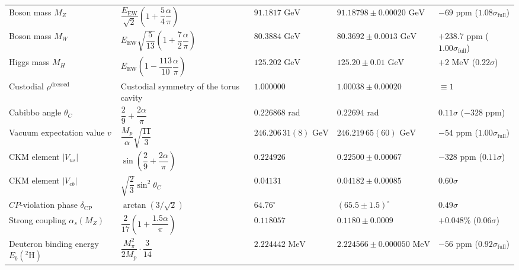 \documentclass[11pt,a4paper]{article}
\theoremstyle{definition}
\theoremstyle{remark}
\begin{document}
\begin{xltabular}{\textwidth}{
>{\raggedright\arraybackslash}p{3.8cm}
>{\centering\arraybackslash}X
>{\centering\arraybackslash}p{2.7cm}
>{\centering\arraybackslash}p{2.8cm}
>{\centering\arraybackslash}p{2.0cm}
}
Boson mass $M_Z$ & $\dfrac{E_{\mathrm{EW}}}{\sqrt{2}}\left(1 + \dfrac{5}{4}\dfrac{\alpha}{\pi}\right)$ & $91.1817\text{ GeV}$ & $91.18798 \pm 0.00020\text{ GeV}$ & $-69\text{ ppm}$ ($1.08\sigma_{\mathrm{full}}$) \\

Boson mass $M_W$ & $E_{\mathrm{EW}}\sqrt{\dfrac{5}{13}}\left(1 + \dfrac{7}{2}\dfrac{\alpha}{\pi}\right)$ & $80.3884\text{ GeV}$ & $80.3692 \pm 0.0013\text{ GeV}$ & $+238.7\text{ ppm}$ ($1.00\sigma_{\mathrm{full}}$) \\


Higgs mass $M_H$ & $E_{\mathrm{EW}}\left(1 - \dfrac{113}{10}\dfrac{\alpha}{\pi}\right)$ & $125.202\text{ GeV}$ & $125.20 \pm 0.01\text{ GeV}$ & $+2\text{ MeV}$ ($0.22\sigma$) \\

Custodial $\rho^{\mathrm{dressed}}$ & Custodial symmetry of the torus cavity & $1.000000$ & $1.00038 \pm 0.00020$ &  $\equiv 1$ \\

Cabibbo angle $\theta_C$ & $\dfrac{2}{9} + \dfrac{2\alpha}{\pi}$ & $0.226868\text{ rad}$ & $0.22694\text{ rad}$ & $0.11\sigma$ ($-328\text{ ppm}$) \\

Vacuum expectation value $v$ & $\dfrac{M_p}{\alpha}\sqrt{\dfrac{11}{3}}$ & $246.206\,31(8)\text{ GeV}$ & $246.219\,65(60)\text{ GeV}$ & $-54\text{ ppm}$ ($1.00\sigma_{\mathrm{full}}$) \\

CKM element $|V_{us}|$ & $\sin\left(\dfrac{2}{9} + \dfrac{2\alpha}{\pi}\right)$ & $0.224926$ & $0.22500 \pm 0.00067$ & $-328\text{ ppm}$ ($0.11\sigma$) \\

CKM element $|V_{cb}|$ & $\sqrt{\dfrac{2}{3}} \sin^2\theta_C$ & $0.04131$ & $0.04182 \pm 0.00085$ & $0.60\sigma$ \\

$CP$-violation phase $\delta_{\mathrm{CP}}$ & $\arctan(3 / \sqrt{2})$ & $64.76^\circ$ & $(65.5 \pm 1.5)^\circ$ & $0.49\sigma$ \\

Strong coupling $\alpha_s(M_Z)$ & $\dfrac{2}{17}\left(1 + \dfrac{1.5\alpha}{\pi}\right)$ & $0.118057$ & $0.1180 \pm 0.0009$ & $+0.048\%$ ($0.06\sigma$) \\

Deuteron binding energy $E_b(^2\mathrm{H})$ & $\dfrac{M_\pi^2}{2 M_p} \cdot \dfrac{3}{14}$ & $2.224442\text{ MeV}$ & $2.224566 \pm 0.000050\text{ MeV}$ & $-56\text{ ppm}$ ($0.92\sigma_{\mathrm{full}}$) \\


\end{xltabular}
\end{document}
